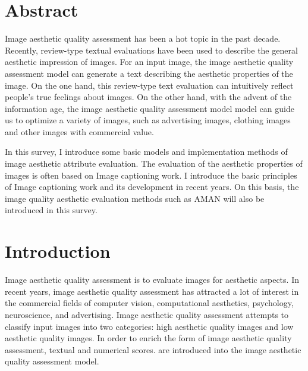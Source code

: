 \documentclass[xelatex,a4j,10pt,twocolumn]{article}
\begin{document}

\section*{Abstract}
\label{sec:abstract}
Image aesthetic quality assessment has been a hot topic in the past decade. Recently, review-type textual evaluations have been used to describe the general aesthetic impression of images. For an input image, the image aesthetic quality assessment model can generate a text describing the aesthetic properties of the image. On the one hand, this review-type text evaluation can intuitively reflect people's true feelings about images. On the other hand, with the advent of the information age, the image aesthetic quality assessment model model can guide us to optimize a variety of images, such as advertising images, clothing images and other images with commercial value.

In this survey, I introduce some basic models and implementation methods of image aesthetic attribute evaluation. The evaluation of the aesthetic properties of images is often based on Image captioning work. I introduce the basic principles of Image captioning work and its development in recent years. On this basis, the image quality aesthetic evaluation methods such as AMAN will also be introduced in this survey.


\section{Introduction}
\label{sec:introduction}
Image aesthetic quality assessment is to evaluate images for aesthetic aspects. In recent years, image aesthetic quality assessment has attracted a lot of interest in the commercial fields of computer vision, computational aesthetics, psychology, neuroscience, and advertising. Image aesthetic quality assessment attempts to classify input images into two categories: high aesthetic quality images and low aesthetic quality images. In order to enrich the form of image aesthetic quality assessment, textual and numerical scores. are introduced into the image aesthetic quality assessment model.
\end{document}
